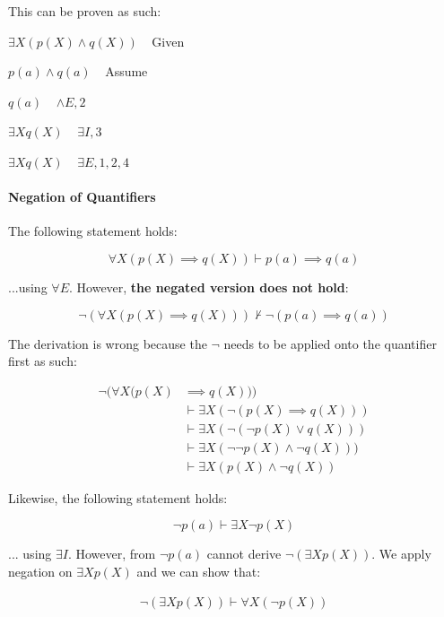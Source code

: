 \documentclass{article}
\newcommand{\indentitem}{\setlength\itemindent{25pt}}
\begin{document}
\begin{multicols}{2}
   This can be proven as such:
   
   \begin{enumerate}
   \item $\exists X (p(X) \land q(X))$ $\>\>$ Given
   {\indentitem 
       \item $p(a) \land q(a)$ $\>\>$ Assume
       \item $q(a)$ $\>\>$ $\land E, 2$
       \item $\exists X q(X)$ $\>\>$ $\exists I, 3$}
   \item $\exists X q(X)$ $\>\>$ $\exists E, 1, 2, 4$
   \end{enumerate}
   
   \paragraph{Negation of Quantifiers} The following statement holds:
   
   $$\forall X (p(X) \implies q(X)) \vdash p(a) \implies q(a)$$
   
   ...using $\forall E$. However, {\bf the negated version does not hold}:

   $$\lnot (\forall X (p(X) \implies q(X))) \nvdash \lnot (p(a) \implies q(a))$$
   
   The derivation is wrong because the $\lnot$ needs to be applied onto the quantifier first as such:
   
   \begin{align*}
   \lnot (\forall X (p(X) &\implies q(X))) \\
   	 &\vdash \exists X (\lnot (p(X) \implies q(X)))\\
   	 &\vdash \exists X (\lnot (\lnot p(X) \lor q(X)))\\
   	 &\vdash \exists X (\lnot\lnot p(X) \land \lnot q(X)))\\
   	 &\vdash \exists X (p(X) \land \lnot q(X))
   \end{align*}
   
   Likewise, the following statement holds:
   
   $$\lnot p(a) \vdash \exists X \lnot p(X)$$
   
   ... using $\exists I$. However, from $\lnot p(a)$ cannot derive $\lnot (\exists X p(X))$. We apply negation on $\exists X p(X)$ and we can show that:
  
   \begin{align*}
   \lnot (\exists X p(X)) \vdash \forall X (\lnot p(X))
   \end{align*}
   
  \end{multicols}
\end{document}
